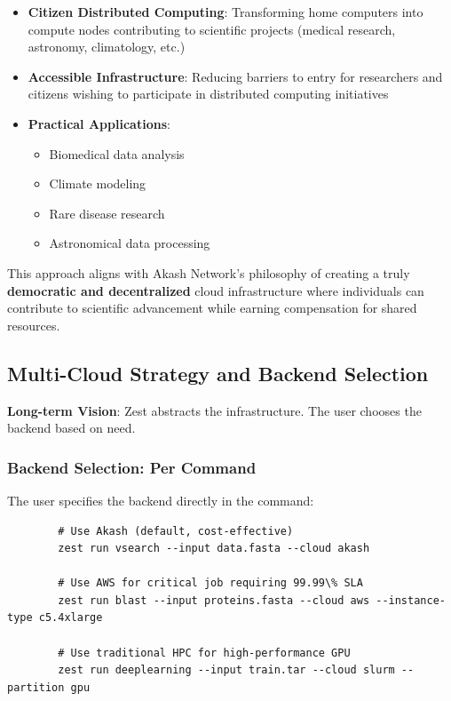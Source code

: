 \documentclass[11pt,a4paper]{article}
\begin{document}
	\begin{itemize}
		\item \textbf{Citizen Distributed Computing}: Transforming home computers into compute nodes contributing to scientific projects (medical research, astronomy, climatology, etc.)
		
		\item \textbf{Accessible Infrastructure}: Reducing barriers to entry for researchers and citizens wishing to participate in distributed computing initiatives
		
		\item \textbf{Practical Applications}:
		\begin{itemize}
			\item Biomedical data analysis
			\item Climate modeling
			\item Rare disease research
			\item Astronomical data processing
		\end{itemize}
	\end{itemize}
	
	This approach aligns with Akash Network's philosophy of creating a truly \textbf{democratic and decentralized} cloud infrastructure where individuals can contribute to scientific advancement while earning compensation for shared resources.
	
	\newpage
	
	\subsection{Multi-Cloud Strategy and Backend Selection}
	
	\textbf{Long-term Vision}: Zest abstracts the infrastructure. The user chooses the backend based on need.
	
	\subsubsection{Backend Selection: Per Command}
	
	The user specifies the backend directly in the command:
	
	\begin{lstlisting}
		# Use Akash (default, cost-effective)
		zest run vsearch --input data.fasta --cloud akash
		
		# Use AWS for critical job requiring 99.99\% SLA
		zest run blast --input proteins.fasta --cloud aws --instance-type c5.4xlarge
		
		# Use traditional HPC for high-performance GPU
		zest run deeplearning --input train.tar --cloud slurm --partition gpu
	\end{lstlisting}
	
\end{document}
